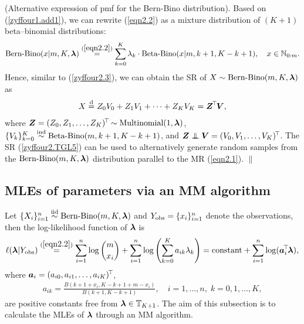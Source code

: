 \begin{remark} \label{rem1} {\rm (\textsf{Alternative expression of pmf for the Bern-Bino distribution}). Based on (\ref{zyffour1.add1}), we can rewrite (\ref{eqn2.2}) as a mixture distribution of $(K+1)$ beta--binomial distributions:
\begin{eqnarray}  \label{eqn2.TGL4}
   \mbox{Bern-Bino}(x|m, K, {\boldsymbol{\lambda}}) \stackrel{(\ref{eqn2.2})}{=} \sum_{k=0}^K  \lambda_k \cdot \mbox{Beta-Bino}(x|m, k+1, K-k+1), \quad x \in {\mathbb{N}}_{0:m}.
\end{eqnarray}
Hence, similar to (\ref{zyffour2.3}), we can obtain the SR of $X \sim \mbox{Bern-Bino}(m, K, {\boldsymbol{\lambda}})$ as
\begin{eqnarray} \label{zyffour2.TGL5}
   X \stackrel{{\rm d}}{=} Z_0 V_0 + Z_1 V_1 + \cdots + Z_K V_K = {\boldsymbol{Z}}^{\!\top\!} \boldsymbol{V},
\end{eqnarray}
where ${\boldsymbol{Z}} = (Z_0,Z_1,\ldots,Z_K)^{\!\top\!} \sim \mbox{Multinomial}(1,{\boldsymbol{\lambda}})$, $\{V_k\}_{k=0}^K \stackrel{{\rm ind}}{\sim} \mbox{Beta-Bino}(m, k+1, K -k+1)$, and $\ibZ \inde \ibV = (V_0, V_1,\ldots, V_K)^{\T}$. The SR (\ref{zyffour2.TGL5}) can be used to alternatively generate random samples from the $\mbox{Bern-Bino}(m, K, {\boldsymbol{\lambda}})$ distribution parallel to the MR (\ref{eqn2.1}). \hfill $\|$
}\end{remark}



\subsection{MLEs of parameters via an MM algorithm}  %

Let $\{X_i\}_{i=1}^n \stackrel{{\rm iid}}{\sim} \mbox{Bern-Bino}(m, K, {\boldsymbol{\lambda}})$ and $Y_{\rm obs} = \{x_i\}_{i=1}^n$ denote the observations, then the log-likelihood function of ${\boldsymbol{\lambda}}$ is
\begin{eqnarray} \label{zyffour2.4}
   \ell({\boldsymbol{\lambda}}|Y_{\rm obs}) \stackrel{(\ref{eqn2.2})}{=} \sum_{i=1}^n \log\binom{m}{x_i} + \sum_{i=1}^n \log \left( \sum_{k=0}^K a_{ik} \lambda_k \right) = \mbox{constant} + \sum_{i=1}^n \log ({\boldsymbol{a}}_i^{\!\top\!}{\boldsymbol{\lambda}}),
\end{eqnarray}
where ${\boldsymbol{a}}_i =(a_{i0}, a_{i1}, \dots, a_{iK})^{\!\top\!}$,
\begin{eqnarray}   \label{zyffour2.5}
   a_{ik} = \frac{B(k+1+x_i,K-k+1+m-x_i)}{B(k+1,K-k+1)}, \quad i=1, \dots, n, \; k=0, 1, \dots, K,
\end{eqnarray}
are positive constants free from ${\boldsymbol{\lambda}} \in {\mathbb{T}}_{K+1}$. The aim of this subsection is to calculate the MLEs of ${\boldsymbol{\lambda}}$ through an MM algorithm.

